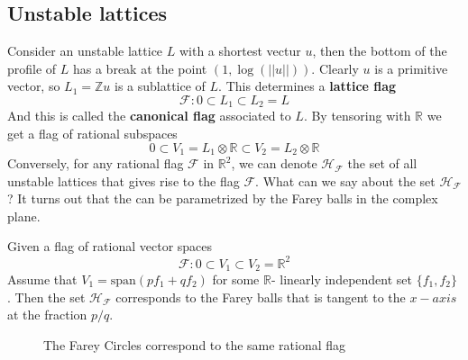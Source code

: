 \subsection{Unstable lattices}
Consider an unstable lattice $L$ with a shortest vectur $u$, then the bottom
of the profile of $L$ has a break at the point $(1,\log(||u||))$. Clearly $u$ is a primitive vector, so $L_1 = \mathbb{Z}u$
is a sublattice of $L$. This determines a \textbf{lattice flag}
\[\mathcal{F}: 0 \subset L_1 \subset L_2 = L\]
And this is called the \textbf{canonical flag} associated to $L$. By tensoring with $\mathbb{R}$ we get
a flag of rational subspaces
\[0 \subset V_1 = L_1 \otimes \mathbb{R} \subset V_2 = L_2 \otimes \mathbb{R}\]
Conversely, for any rational flag $\mathcal{F}$ in $\mathbb{R}^2$, we can denote $\mathcal{H}_\mathcal{F}$ the set of all
unstable lattices that gives rise to the flag $\mathcal{F}$. What can we say about the set
$\mathcal{H}_\mathcal{F}$? It turns out that the can be parametrized by the Farey balls in the complex plane.
\begin{prop}
  Given a flag of rational vector spaces
  \[\mathcal{F}: 0 \subset V_1 \subset V_2 =\mathbb{R}^2\]
  Assume that $V_1 = \text{span}(pf_1+qf_2)$ for some $\mathbb{R}$- linearly independent set $\{f_1,f_2\}$ . Then
  the set $\mathcal{H}_\mathcal{F}$ corresponds to the Farey balls that is tangent to the $x-axis$ at the fraction $p/q$.
\end{prop}
\begin{figure}[h]
  \centering
  \caption{The Farey Circles correspond to the same rational flag}
  \label{P-coordinate}
\end{figure}
